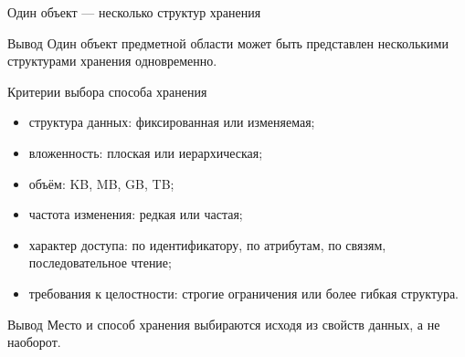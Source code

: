 \documentclass[aspectratio=169]{beamer}
\begin{document}
\begin{frame}{Один объект — несколько структур хранения}

\begin{center}
\end{center}

\begin{alertblock}{Вывод}
Один объект предметной области может быть представлен несколькими структурами хранения одновременно.
\end{alertblock}

\end{frame}


\begin{frame}{Критерии выбора способа хранения}

\begin{itemize}
  \item структура данных: фиксированная или изменяемая;
  \item вложенность: плоская или иерархическая;
  \item объём: KB, MB, GB, TB;
  \item частота изменения: редкая или частая;
  \item характер доступа: по идентификатору, по атрибутам,
        по связям, последовательное чтение;
  \item требования к целостности: строгие ограничения
        или более гибкая структура.
\end{itemize}

\vspace{0.3cm}

\begin{block}{Вывод}
Место и способ хранения выбираются исходя
из свойств данных, а не наоборот.
\end{block}

\end{frame}
\end{document}
